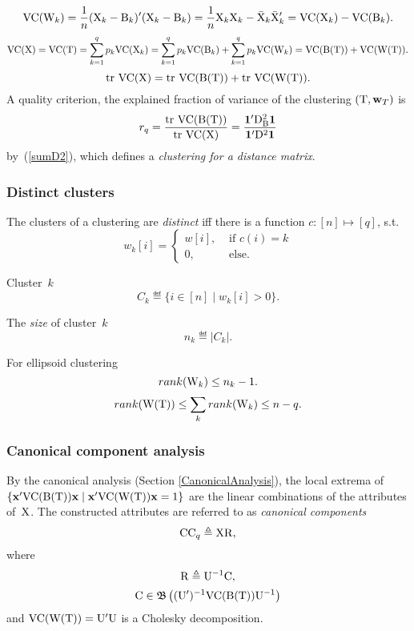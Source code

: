 \documentclass[10pt,a4paper]{article}
\theoremstyle{plain} \newtheorem{Lem}{Lemma}
\begin{document}
\bigskip
$$ \mathrm {VC}(\mathrm W_k) = \frac 1 n (\mathrm X_k - \mathrm B_k)' (\mathrm X_k - \mathrm B_k) = \frac 1 n \mathrm X_k \mathrm X_k - \bar {\mathrm X}_k \bar {\mathrm X}_k' = \mathrm {VC}(\mathrm X_k) - \mathrm {VC}(\mathrm B_k). $$
$$ \mathrm {VC}(\mathrm X) = \mathrm {VC}(\mathrm T) = \sum_{k=1}^q p_k \mathrm {VC}(\mathrm X_k) = \sum_{k=1}^q p_k \mathrm {VC}(\mathrm B_k) + \sum_{k=1}^q p_k \mathrm {VC}(\mathrm W_k) = \mathrm {VC}(\mathrm B(\mathrm T)) + \mathrm {VC}(\mathrm W(\mathrm T)). $$
$$ \mathrm {tr} \  \mathrm {VC}(\mathrm X) = \mathrm {tr} \  \mathrm {VC}(\mathrm B(\mathrm T)) + \mathrm {tr} \  \mathrm {VC}(\mathrm W(\mathrm T)). $$
A quality criterion, the explained fraction of variance of the clustering $(\mathrm T, \mathbf w_T)$ is
$$ r_q = \frac {\mathrm {tr} \  \mathrm {VC}(\mathrm B(\mathrm T))} {\mathrm {tr} \  \mathrm {VC}(\mathrm X)} = \frac {\mathbf 1' \mathrm D^2_{\mathrm B} \mathbf 1} {\mathbf 1' \mathrm D^2 \mathbf 1}
$$
by~(\ref{sumD2}),
which defines a {\em clustering for a distance matrix}.


\subsubsection {Distinct clusters}
The clusters of a clustering are {\em distinct} iff there is a function $c : [n] \mapsto [q]$, s.t.
\begin{equation*}
  w_k[i] =
    \begin{cases}
      w[i], &\text{ if } c(i) = k\\
      0,   &\text{ else}.
    \end{cases}
\end{equation*}

Cluster~$k$
$$ C_k \eqdef \{i \in [n] \mid w_k[i] > 0\}. $$

The {\em size} of cluster~$k$
$$ n_k \eqdef |C_k|. $$

For ellipsoid clustering
$$ rank(\mathrm W_k) \le n_k - 1. $$
$$ rank(\mathrm W(\mathrm T)) \le \sum_k rank(\mathrm W_k) \le n - q. $$


\subsubsection{Canonical component analysis}
By the canonical analysis (Section \ref{CanonicalAnalysis}),
the local extrema of $\{\mathbf x' \mathrm {VC}(\mathrm B(\mathrm T)) \mathbf x \mid \mathbf x' \mathrm {VC} (\mathrm W(\mathrm T)) \mathbf x = 1\}$
are the linear combinations of the attributes of~$\mathrm X$.
The constructed attributes are referred to as {\em canonical components}
$$ \mathrm {CC}_q \triangleq \mathrm X \mathrm R, $$
where
$$ \mathrm R \triangleq \mathrm U^{-1} \mathrm C, $$
$$ \mathrm C \in \mathfrak B \left((\mathrm U')^{-1} \mathrm {VC}(\mathrm B(\mathrm T)) \mathrm U^{-1} \right) $$
and $\mathrm {VC}(\mathrm W(\mathrm T)) = \mathrm U' \mathrm U$ is a Cholesky decomposition.
\end{document}
